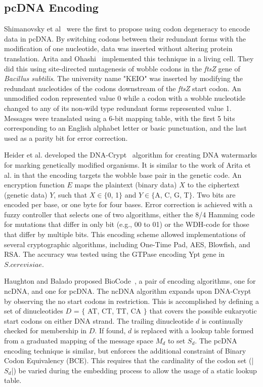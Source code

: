 \documentclass[USenglish,oneside,twocolumn]{article}
\begin{document}
\subsection{pcDNA Encoding}

Shimanovsky et al~\cite{SFHC2003BL} were the first to propose using codon degeneracy to encode data in pcDNA. By switching codons between their redundant forms with the modification of one nucleotide, data was inserted without altering protein translation. Arita and Ohashi~\cite{AY2004BP} implemented this technique in a living cell. They did this using site-directed mutagenesis of wobble codons in the \textit{ftsZ} gene of \textit{Bacillus subtilis}. The university name "KEIO" was inserted by modifying the redundant nucleotides of the codons downstream of the \textit{ftsZ} start codon. An unmodified codon represented value 0 while a codon with a wobble nucleotide changed to any of its non-wild type redundant forms represented value 1. Messages were translated using a 6-bit mapping table, with the first 5 bits corresponding to an English alphabet letter or basic punctuation, and the last used as a parity bit for error correction.

Heider et al. developed the DNA-Crypt~\cite{HBBMC2007} algorithm for creating DNA watermarks for marking genetically modified organisms. It is similar to the work of Arita et al. in that the encoding targets the wobble base pair in the genetic code. An encryption function $E$ maps the plaintext (binary data) $X$ to the ciphertext (genetic data) $Y$, such that $X \in  \{$0, 1$\}$ and $Y \in \{$A, C, G, T$\}$. Two bits are encoded per base, or one byte for four bases. Error correction is achieved with a fuzzy controller that selects one of two algorithms, either the 8/4 Hamming code for mutations that differ in only bit (e.g., 00 to 01) or the WDH-code for those that differ by multiple bits. This encoding scheme allowed implementations of several cryptographic algorithms, including One-Time Pad, AES, Blowfish, and RSA. The accuracy was tested using the GTPase encoding Ypt gene in $S. cerevisiae$.

Haughton and Balado proposed BioCode~\cite{HBBMC2013}, a pair of encoding algorithms, one for ncDNA, and one for pcDNA. The ncDNA algorithm expands upon DNA-Crypt by observing the no start codons in restriction. This is accomplished by defining a set of dinucleotides $D$ = $\{$ AT, CT, TT, CA $\}$ that covers the possible eukaryotic start codons on either DNA strand. The trailing dinucleotide $d$ is continually checked for membership in $D$. If found, $d$ is replaced with a lookup table formed from a graduated mapping of the message space $M_d$ to set $S_d$. The pcDNA encoding technique is similar, but enforces the additional constraint of Binary Codon Equivalency (BCE). This requires that the cardinality of the codon set (|$S_d$|) be varied during the embedding process to allow the usage of a static lookup table.
\end{document}
